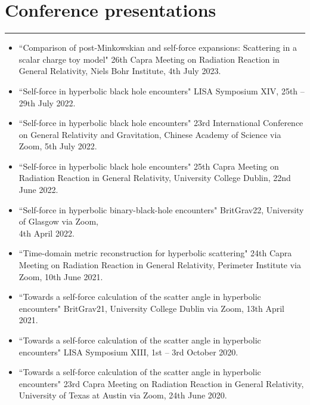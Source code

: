 \documentclass[10.5pt, oneside]{article}   	%
\begin{document}
 {\color{Sectioncolour}
\section*{Conference presentations}
\vspace{-3mm}
\noindent\rule{\linewidth}{0.6pt}}
\begin{itemize}
\item ``Comparison of post-Minkowskian and self-force expansions: Scattering in a scalar charge toy model" 26th Capra Meeting on Radiation Reaction in General Relativity, Niels Bohr Institute, 4th July 2023.
\item``Self-force in hyperbolic black hole encounters" LISA Symposium XIV, 25th -- 29th July 2022. \href{https://www.youtube.com/watch?v=p2-RgYB6Jhk}{}
\item ``Self-force in hyperbolic black hole encounters" 23rd International Conference on General Relativity and Gravitation, Chinese Academy of Science via Zoom, 5th July 2022. \href{https://www.koushare.com/video/videodetail/30159}{}
\item ``Self-force in hyperbolic black hole encounters" 25th Capra Meeting on Radiation Reaction in General Relativity, University College Dublin, 22nd June 2022. \href{https://oliverlong.info/talks/capra25}{}
\item ``Self-force in hyperbolic binary-black-hole encounters" BritGrav22, University of Glasgow via Zoom, \\ 4th April 2022. \href{https://www.youtube.com/watch?v=zZEblkjb5IM}{}
\item ``Time-domain metric reconstruction for hyperbolic scattering" 24th Capra Meeting on Radiation Reaction in General Relativity, Perimeter Institute via Zoom, 10th June 2021. \href{https://pirsa.org/21060058}{}
\item ``Towards a self-force calculation of the scatter angle in hyperbolic encounters" BritGrav21, University College Dublin via Zoom, 13th April 2021. \href{https://oliverlong.info/talks/britgrav21}{}
\item``Towards a self-force calculation of the scatter angle in hyperbolic encounters" LISA Symposium XIII, 1st -- 3rd October 2020. \href{https://lisasymposium13.lisamission.org/presentations/i0xMnRFWi7WKbO5f01caGDH0zPK2/7qz7uYC3qHuzj9AsC49h}{}
\item ``Towards a self-force calculation of the scatter angle in hyperbolic encounters" 23rd Capra Meeting on Radiation Reaction in General Relativity, University of Texas at Austin via Zoom, 24th June 2020. \href{https://www.youtube.com/watch?v=HB-Rw5kRUfg&t=11311s}{}
\end{itemize} 
 
\end{document}
